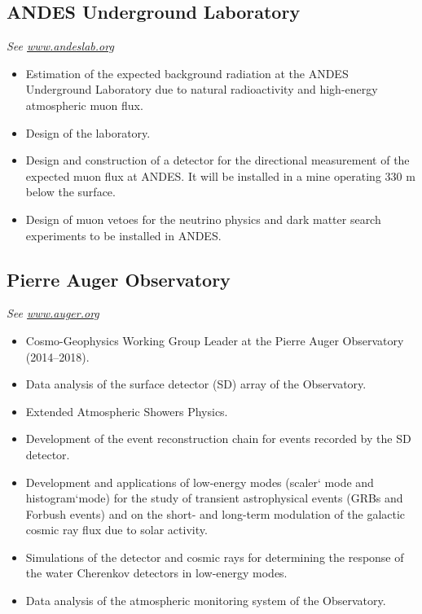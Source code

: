 \subsection*{ANDES Underground Laboratory}
{\small{\textit{See \href{http://www.andeslab.org}{www.andeslab.org}}}}
\begin{itemize}
\item Estimation of the expected background radiation at the ANDES Underground Laboratory due to natural radioactivity and high-energy atmospheric muon flux.
\item Design of the laboratory.
\item Design and construction of a detector for the directional measurement of the expected muon flux at ANDES. It will be installed in a mine operating 330 m below the surface.
\item Design of muon vetoes for the neutrino physics and dark matter search experiments to be installed in ANDES.
\end{itemize}

\subsection*{Pierre Auger Observatory}
{\small{\textit{See \href{http://www.auger.org/}{www.auger.org}}}}
\begin{itemize}
\item Cosmo-Geophysics Working Group Leader at the Pierre Auger Observatory (2014--2018).
\item Data analysis of the surface detector (SD) array of the Observatory.
\item Extended Atmospheric Showers Physics.
\item Development of the event reconstruction chain for events recorded by the SD detector.
\item Development and applications of low-energy modes (scaler` mode and histogram`mode) for the study of transient astrophysical events (GRBs and Forbush events) and on the short- and long-term modulation of the galactic cosmic ray flux due to solar activity.
\item Simulations of the detector and cosmic rays for determining the response of the water Cherenkov detectors in low-energy modes.
\item Data analysis of the atmospheric monitoring system of the Observatory.
\end{itemize}

